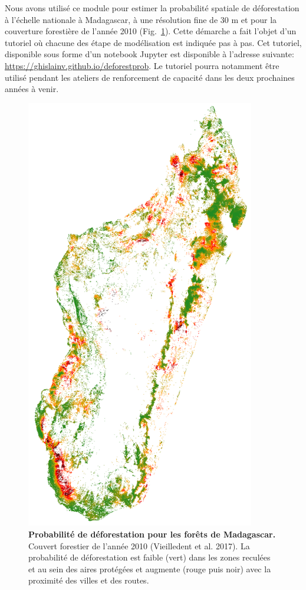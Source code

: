 \documentclass[12pt,]{article}
\begin{document}
Nous avons utilisé ce module pour estimer la probabilité spatiale de
déforestation à l'échelle nationale à Madagascar, à une résolution fine
de 30 m et pour la couverture forestière de l'année 2010
(Fig.~\ref{fig:pred}). Cette démarche a fait l'objet d'un tutoriel où
chacune des étape de modélisation est indiquée pas à pas. Cet tutoriel,
disponible sous forme d'un notebook Jupyter est disponible à l'adresse
suivante: \url{https://ghislainv.github.io/deforestprob}. Le tutoriel
pourra notamment être utilisé pendant les ateliers de renforcement de
capacité dans les deux prochaines années à venir.







\begin{figure}[H]

{\centering \includegraphics[width=10cm]{figures/pred_binomial_iCAR} 

}

\caption{\textbf{Probabilité de déforestation pour les forêts de
Madagascar.} Couvert forestier de l'année 2010 (Vieilledent et al.
2017). La probabilité de déforestation est faible (vert) dans les zones
reculées et au sein des aires protégées et augmente (rouge puis noir)
avec la proximité des villes et des routes.}\label{fig:pred}
\end{figure}
\end{document}
